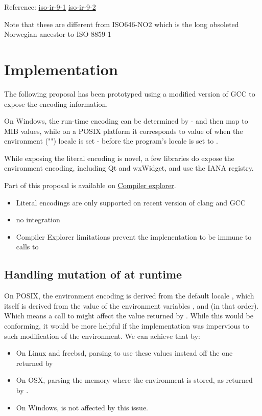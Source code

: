 \documentclass{wg21}
\begin{document}
Reference: \href{https://www.itscj.ipsj.or.jp/iso-ir/009-1.pdf}{iso-ir-9-1} \href{https://www.itscj.ipsj.or.jp/iso-ir/009-2.pdf}{iso-ir-9-2}

Note that these are different from ISO646-NO2 which is the long obsoleted Norwegian ancestor to ISO 8859-1


\section{Implementation}

The following proposal has been prototyped using a modified version of GCC to expose the encoding information.

On Windows, the run-time encoding can be determined by  - and then map to MIB values, while on a POSIX platform it corresponds to value of  when the environment ("") locale is set - before the program's locale is set to .


While exposing the literal encoding is novel, a few libraries do expose the environment encoding, including Qt and wxWidget, and use the IANA registry.

Part of this proposal is available on \href{https://compiler-explorer.com/z/KMPeGnEje}{Compiler explorer}.
\begin{itemize}
\item Literal encodings are only supported on recent version of clang and GCC
\item no  integration
\item Compiler Explorer limitations prevent the implenentation to be immune to calls to 
\end{itemize}

\subsection{Handling mutation of  at runtime}

On POSIX, the environment encoding is derived from the default locale , which
itself is derived from the value of the environment variables ,  and 
(in that order).
Which means a call to  might affect the value returned by .
While this would be conforming, it would be more helpful if the implementation was impervious to such modification of the environment.
We can achieve that by:
\begin{itemize}
\item On Linux and freebsd, parsing  to use these values instead off the one returned by 
\item On OSX, parsing the memory where the environment is stored, as returned by .
\item On Windows,  is not affected by this issue.
\end{itemize}
\end{document}

